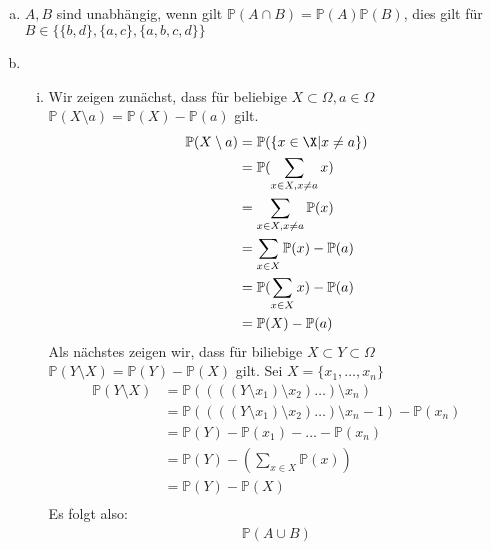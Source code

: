 \documentclass{article}
\renewcommand{\P}{\mathbb{P}}
\begin{document}
    \subsection{}
    \begin{enumerate}[a)]
        \item
            $A, B$ sind unabhängig, wenn gilt
            $\P(A\cap B)=\P(A)\P(B)$, dies gilt für\\
            $B\in\{\{b,d\},\{a,c\},\{a,b,c,d\}\}$
        \item
            \begin{enumerate}[(i)]
                \item
                    Wir zeigen zunächst, dass für beliebige $X\subset\Omega,a\in\Omega$
                    $\P(X\setminus a)=\P(X)-\P(a)$ gilt.
                    \begin{align*}
                        \P(X\setminus a)&
                        =\P(\{x\in\X|x\neq a\})\\
                        &=\P(\sum_{x\in X,x\neq a}x)\\
                        &=\sum_{x\in X,x\neq a}\P(x)\\
                        &=\sum_{x\in X}\P(x)-\P(a)\\
                        &=\P(\sum_{x\in X}x)-\P(a)\\
                        &=\P(X)-\P(a)\\
                    \end{align*}
                    Als nächstes zeigen wir, dass für biliebige $X\subset Y\subset \Omega$
                    $\P(Y\setminus X)=\P(Y)-\P(X)$ gilt. Sei $X=\{x_1, \hdots, x_n\}$
                    \begin{align*}
                        \P(Y\setminus X)
                        &=\P((((Y\setminus x_1)\setminus x_2)\hdots)\setminus x_n)\\
                        &=\P((((Y\setminus x_1)\setminus x_2)\hdots)\setminus x_n-1)-\P(x_n)\\
                        &=\P(Y)-\P(x_1)-\hdots-\P(x_n)\\
                        &=\P(Y)-\left(\sum_{x\in X}\P(x)\right)\\
                        &=\P(Y)-\P(X)\\
                    \end{align*}
                    Es folgt also:
                    \begin{align*}
                        \P(A\cup B)

\end{align*}
\end{enumerate}
\end{enumerate}
\end{document}
